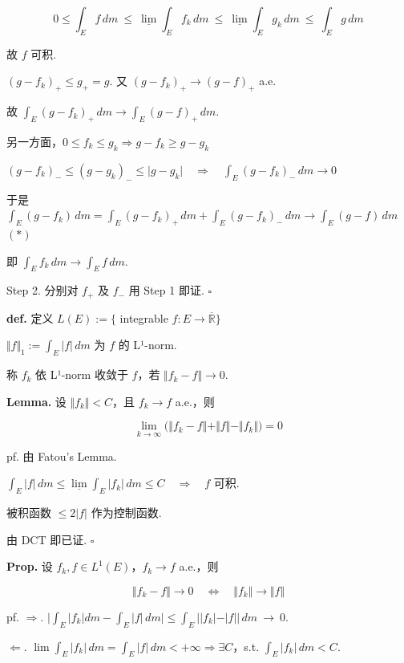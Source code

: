 \documentclass[11pt]{ctexart}
\theoremstyle{definition}
\begin{document}
\[
0 \leq \int_E f \, dm \ \leq\ \underline{\lim} \int_E f_k \, dm \ \leq\ \underline{\lim} \int_E g_k \, dm \ \leq\ \int_E g \, dm
\]

故 $f$ 可积.

$(g - f_k)_+ \leq g_+ = g$. 又 $(g - f_k)_+ \to (g - f)_+$  a.e.

故 $\displaystyle\int_E (g - f_k)_+ \, dm \to \int_E (g - f)_+ \, dm$.

另一方面，$0 \leq f_k \leq g_k \Rightarrow g - f_k \geq g - g_k$

$(g - f_k)_- \leq (g - g_k)_- \leq \vert g - g_k\vert \quad \Rightarrow \quad \int_E (g - f_k)_- \, dm \to 0$

于是 $\displaystyle\int_E (g - f_k) \, dm = \int_E (g - f_k)_+ \, dm + \int_E (g - f_k)_- \, dm \to \int_E (g - f) \, dm$  $(\ast)$

即 $\displaystyle\int_E f_k \, dm \to \int_E f \, dm$.

Step 2. 分别对 $f_+$ 及 $f_-$ 用 Step 1 即证. $\square$

\textbf{def.} 定义 $L(E) := \{$ integrable $f: E \to \overline{\mathbb{R}}\}$

$\Vert f\Vert_1 := \int_E \vert f\vert \, dm$ 为 $f$ 的 L¹-norm.

称 $f_k$ 依 L¹-norm 收敛于 $f$，若 $\Vert f_k - f\Vert \to 0$.

\textbf{Lemma.} 设 $\Vert f_k\Vert < C$，且 $f_k \to f$ a.e.，则

\[
\lim_{k \to \infty} \big(\Vert f_k - f\Vert + \Vert f\Vert - \Vert f_k\Vert\big) = 0
\]

pf. 由 Fatou's Lemma.

$\displaystyle\int_E \vert f\vert \, dm \leq \underline{\lim} \int_E \vert f_k\vert \, dm \leq C \quad \Rightarrow \quad f$ 可积.

被积函数 $\leq 2\vert f\vert$ 作为控制函数.

由 DCT 即已证. $\square$

\textbf{Prop.} 设 $f_k, f \in L^1(E)$，$f_k \to f$ a.e.，则

\[
\Vert f_k - f\Vert \to 0 \quad \iff \quad \Vert f_k\Vert \to \Vert f\Vert
\]

pf. $\Rightarrow$. $\Big\vert \int_E \vert f_k\vert dm - \int_E \vert f\vert \, dm\Big\vert \leq \int_E \big\vert \vert f_k\vert - \vert f\vert\big\vert \, dm \ \to\ 0$.

$\Leftarrow$. $\lim \int_E \vert f_k\vert \, dm = \int_E \vert f\vert \, dm < +\infty \Rightarrow \exists C$，s.t. $\int_E \vert f_k\vert \, dm < C$.
\end{document}
